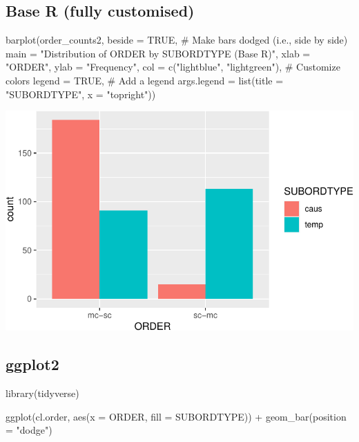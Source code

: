 \documentclass[
  11pt,
  letterpaper,
  DIV=11,
  numbers=noendperiod]{scrreprt}
\newenvironment{Shaded}{\begin{snugshade}}{\end{snugshade}}
\newcommand{\AttributeTok}[1]{\textcolor[rgb]{0.40,0.45,0.13}{#1}}
\newcommand{\CommentTok}[1]{\textcolor[rgb]{0.37,0.37,0.37}{#1}}
\newcommand{\ConstantTok}[1]{\textcolor[rgb]{0.56,0.35,0.01}{#1}}
\newcommand{\FunctionTok}[1]{\textcolor[rgb]{0.28,0.35,0.67}{#1}}
\newcommand{\NormalTok}[1]{\textcolor[rgb]{0.00,0.23,0.31}{#1}}
\newcommand{\SpecialCharTok}[1]{\textcolor[rgb]{0.37,0.37,0.37}{#1}}
\newcommand{\StringTok}[1]{\textcolor[rgb]{0.13,0.47,0.30}{#1}}
\begin{document}
\subsection{Base R (fully customised)}

\begin{Shaded}
\begin{Highlighting}[]
\FunctionTok{barplot}\NormalTok{(order\_counts2, }
        \AttributeTok{beside =} \ConstantTok{TRUE}\NormalTok{,  }\CommentTok{\# Make bars dodged (i.e., side by side)}
        \AttributeTok{main =} \StringTok{"Distribution of ORDER by SUBORDTYPE (Base R)"}\NormalTok{, }
        \AttributeTok{xlab =} \StringTok{"ORDER"}\NormalTok{, }
        \AttributeTok{ylab =} \StringTok{"Frequency"}\NormalTok{, }
        \AttributeTok{col =} \FunctionTok{c}\NormalTok{(}\StringTok{"lightblue"}\NormalTok{, }\StringTok{"lightgreen"}\NormalTok{), }\CommentTok{\# Customize colors}
        \AttributeTok{legend =} \ConstantTok{TRUE}\NormalTok{,  }\CommentTok{\# Add a legend}
        \AttributeTok{args.legend =} \FunctionTok{list}\NormalTok{(}\AttributeTok{title =} \StringTok{"SUBORDTYPE"}\NormalTok{, }\AttributeTok{x =} \StringTok{"topright"}\NormalTok{))}
\end{Highlighting}
\end{Shaded}

\includegraphics{Categorical_data_files/figure-pdf/unnamed-chunk-13-1.pdf}

\subsection{ggplot2}

\begin{Shaded}
\begin{Highlighting}[]
\FunctionTok{library}\NormalTok{(tidyverse)}

\FunctionTok{ggplot}\NormalTok{(cl.order, }\FunctionTok{aes}\NormalTok{(}\AttributeTok{x =}\NormalTok{ ORDER, }\AttributeTok{fill =}\NormalTok{ SUBORDTYPE)) }\SpecialCharTok{+}
  \FunctionTok{geom\_bar}\NormalTok{(}\AttributeTok{position =} \StringTok{"dodge"}\NormalTok{)}
\end{Highlighting}
\end{Shaded}
\end{document}
